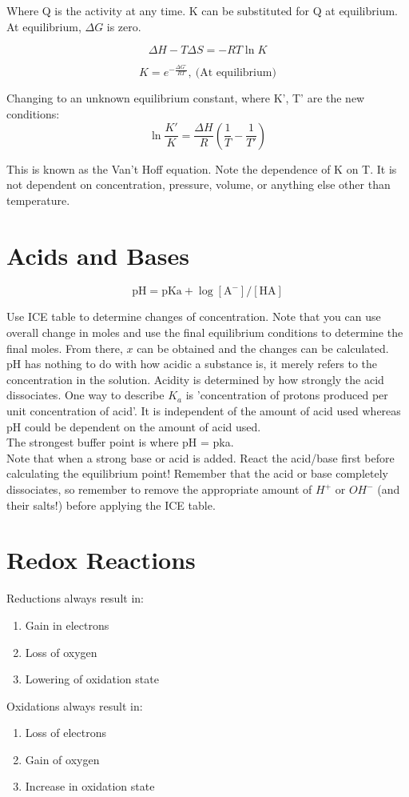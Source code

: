 \documentclass{article}
\begin{document}
Where Q is the activity at any time. K can be substituted for Q at equilibrium. At equilibrium, $\Delta G$ is zero.

\[
\Delta H - T\Delta S = -RT \ln K
\]

\[
K = e^{-\frac{\Delta G^{\circ}}{RT}},\ \text{(At equilibrium)}
\]


Changing to an unknown equilibrium constant, where K', T' are the new conditions:
\[
\ln \frac{K'}{K} = \frac{\Delta H}{R} (\frac{1}{T} - \frac{1}{T'})
\]

This is known as the Van't Hoff equation. Note the dependence of K on T. It is not dependent on concentration, pressure, volume, or anything else other than temperature.

\section{Acids and Bases}

\[
\text{pH} = \text{pKa} + \log[\text{A}^-]/[\text{HA}]
\]

Use ICE table to determine changes of concentration. Note that you can use overall change in moles and use the final equilibrium conditions to determine the final moles. From there, $x$ can be obtained and the changes can be calculated.\\

pH has nothing to do with how acidic a substance is, it merely refers to the concentration in the solution. Acidity is determined by how strongly the acid dissociates. One way to describe $K_a$ is 'concentration of protons produced per unit concentration of acid'. It is independent of the amount of acid used whereas pH could be dependent on the amount of acid used.\\

The strongest buffer point is where pH = pka.\\

Note that when a strong base or acid is added. React the acid/base first before calculating the equilibrium point! Remember that the acid or base completely dissociates, so remember to remove the appropriate amount of $H^+$ or $OH^-$ (and their salts!) before applying the ICE table.\\

\section{Redox Reactions}
Reductions always result in:
\begin{enumerate}
\item Gain in electrons
\item Loss of oxygen
\item Lowering of oxidation state
\end{enumerate}
Oxidations always result in:
\begin{enumerate}
\item Loss of electrons
\item Gain of oxygen
\item Increase in oxidation state

\end{enumerate}
\end{document}
